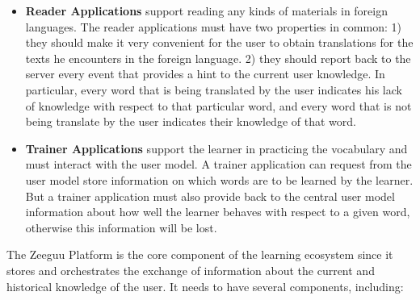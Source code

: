 \begin{itemize}
	
	\item {\bf Reader Applications} 
	support reading any kinds of materials in foreign languages. The reader applications must have two properties in common: 
		1) they should make it very convenient for the user to obtain translations for the texts he encounters in the foreign language. 
		2) they should report back to the server every event that provides a hint to the current user knowledge. In particular, every word that is being translated by the user indicates his lack of knowledge with respect to that particular word, and every word that is not being translate by the user indicates their knowledge of that word.
	
		\item {\bf Trainer Applications} support the learner in practicing the vocabulary and must interact with the user model. A trainer application can request from the user model store information on which words are to be learned by the learner. But a trainer application must also provide back to the central user model information about how well the learner behaves with respect to a given word, otherwise this information will be lost. 

\end{itemize}

The Zeeguu Platform is the core component of the learning ecosystem since it stores and orchestrates the exchange of information about the current and historical knowledge of the user. It needs to have several components, including: 

